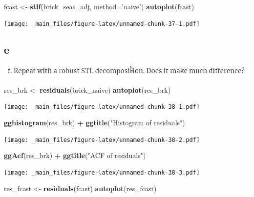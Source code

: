 \documentclass[]{book}
\newenvironment{Shaded}{\begin{snugshade}}{\end{snugshade}}
\newcommand{\DataTypeTok}[1]{\textcolor[rgb]{0.13,0.29,0.53}{#1}}
\newcommand{\KeywordTok}[1]{\textcolor[rgb]{0.13,0.29,0.53}{\textbf{#1}}}
\newcommand{\NormalTok}[1]{#1}
\newcommand{\OperatorTok}[1]{\textcolor[rgb]{0.81,0.36,0.00}{\textbf{#1}}}
\newcommand{\StringTok}[1]{\textcolor[rgb]{0.31,0.60,0.02}{#1}}
\begin{document}
\begin{Shaded}
\begin{Highlighting}[]
\NormalTok{fcast <-}\StringTok{ }\KeywordTok{stlf}\NormalTok{(brick_seas_adj, }\DataTypeTok{method=}\StringTok{'naive'}\NormalTok{)}
\KeywordTok{autoplot}\NormalTok{(fcast)}
\end{Highlighting}
\end{Shaded}

\texttt{[image: \_main\_files/figure-latex/unnamed-chunk-37-1.pdf]}

\hypertarget{e-2}{%
\subsection{e}\label{e-2}}

\includegraphics{./week2/6.6f.png}

\begin{Shaded}
\begin{Highlighting}[]
\NormalTok{res_brk <-}\StringTok{ }\KeywordTok{residuals}\NormalTok{(brick_naive)}
\KeywordTok{autoplot}\NormalTok{(res_brk)}
\end{Highlighting}
\end{Shaded}

\texttt{[image: \_main\_files/figure-latex/unnamed-chunk-38-1.pdf]}

\begin{Shaded}
\begin{Highlighting}[]
\KeywordTok{gghistogram}\NormalTok{(res_brk) }\OperatorTok{+}\StringTok{ }\KeywordTok{ggtitle}\NormalTok{(}\StringTok{"Histogram of residuals"}\NormalTok{)}
\end{Highlighting}
\end{Shaded}

\texttt{[image: \_main\_files/figure-latex/unnamed-chunk-38-2.pdf]}

\begin{Shaded}
\begin{Highlighting}[]
\KeywordTok{ggAcf}\NormalTok{(res_brk) }\OperatorTok{+}\StringTok{ }\KeywordTok{ggtitle}\NormalTok{(}\StringTok{"ACF of residuals"}\NormalTok{)}
\end{Highlighting}
\end{Shaded}

\texttt{[image: \_main\_files/figure-latex/unnamed-chunk-38-3.pdf]}

\begin{Shaded}
\begin{Highlighting}[]
\NormalTok{res_fcast <-}\StringTok{ }\KeywordTok{residuals}\NormalTok{(fcast)}
\KeywordTok{autoplot}\NormalTok{(res_fcast)}
\end{Highlighting}
\end{Shaded}
\end{document}
